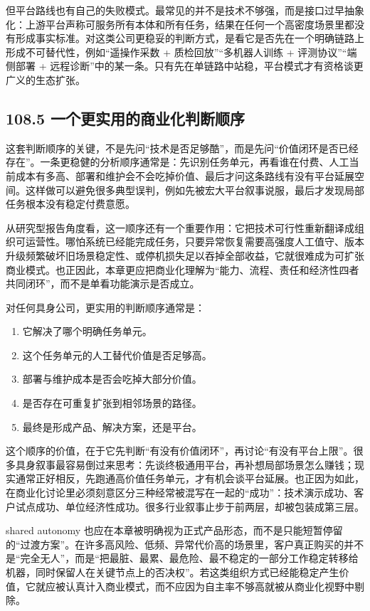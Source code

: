 但平台路线也有自己的失败模式。最常见的并不是技术不够强，而是接口过早抽象化：上游平台声称可服务所有本体和所有任务，结果在任何一个高密度场景里都没有形成事实标准。对这类公司更稳妥的判断方式，是看它是否先在一个明确链路上形成不可替代性，例如“遥操作采数 + 质检回放”“多机器人训练 + 评测协议”“端侧部署 + 远程诊断”中的某一条。只有先在单链路中站稳，平台模式才有资格谈更广义的生态扩张。

\subsection*{108.5 一个更实用的商业化判断顺序}


这套判断顺序的关键，不是先问“技术是否足够酷”，而是先问“价值闭环是否已经存在”。一条更稳健的分析顺序通常是：先识别任务单元，再看谁在付费、人工当前成本有多高、部署和维护会不会吃掉价值、最后才问这条路线有没有平台延展空间。这样做可以避免很多典型误判，例如先被宏大平台叙事说服，最后才发现局部任务根本没有稳定付费意愿。

从研究型报告角度看，这一顺序还有一个重要作用：它把技术可行性重新翻译成组织可运营性。哪怕系统已经能完成任务，只要异常恢复需要高强度人工值守、版本升级频繁破坏旧场景稳定性、或停机损失足以吞掉全部收益，它就很难成为可扩张商业模式。也正因此，本章更应把商业化理解为“能力、流程、责任和经济性四者共同闭环”，而不是单看功能演示是否成立。

对任何具身公司，更实用的判断顺序通常是：

\begin{enumerate}
\item 它解决了哪个明确任务单元。
\item 这个任务单元的人工替代价值是否足够高。
\item 部署与维护成本是否会吃掉大部分价值。
\item 是否存在可重复扩张到相邻场景的路径。
\item 最终是形成产品、解决方案，还是平台。
\end{enumerate}

这个顺序的价值，在于它先判断“有没有价值闭环”，再讨论“有没有平台上限”。很多具身叙事最容易倒过来思考：先谈终极通用平台，再补想局部场景怎么赚钱；现实通常正好相反，先跑通高价值任务单元，才有机会谈平台延展。也正因为如此，在商业化讨论里必须刻意区分三种经常被混写在一起的“成功”：技术演示成功、客户试点成功、单位经济性成功。很多行业叙事止步于前两层，却被包装成第三层。

shared autonomy 也应在本章被明确视为正式产品形态，而不是只能短暂停留的“过渡方案”。在许多高风险、低频、异常代价高的场景里，客户真正购买的并不是“完全无人”，而是“把最脏、最累、最危险、最不稳定的一部分工作稳定转移给机器，同时保留人在关键节点上的否决权”。若这类组织方式已经能稳定产生价值，它就应被认真计入商业模式，而不应因为自主率不够高就被从商业化视野中剔除。

